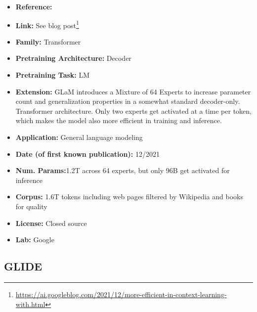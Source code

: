 \documentclass{article}
\begin{document}
            \begin{itemize}
                \item \textbf{Reference:} 
                \item \textbf{Link:} See blog post\footnote{\url{https://ai.googleblog.com/2021/12/more-efficient-in-context-learning-with.html}}
                \item \textbf{Family:} Transformer 
                \item \textbf{Pretraining Architecture:} Decoder
                \item \textbf{Pretraining Task:} LM
                \item \textbf{Extension:} GLaM introduces a Mixture of 64 Experts to increase parameter count and generalization properties in a somewhat standard decoder-only. Transformer architecture. Only two experts get activated at a time per token, which makes the model also more efficient in training and inference.  
                \item \textbf{Application:} General language modeling
                \item \textbf{Date (of first known publication):} 12/2021
                \item \textbf{Num. Params:}1.2T across 64 experts, but only 96B get activated for inference
                \item \textbf{Corpus:} 1.6T tokens including web pages filtered by Wikipedia and books for quality
                \item \textbf{License:} Closed source
                \item \textbf{Lab:} Google
            \end{itemize}


\subsection{GLIDE}
\end{document}
